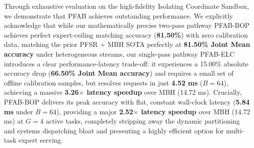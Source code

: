 Through exhaustive evaluation on the high-fidelity Isolating Coordinate Sandbox, we demonstrate that \textsc{PFAB} achieves outstanding performance. We explicitly acknowledge that while our mathematically precise two-pass pathway \textsc{PFAB-BOP} achieves perfect expert-ceiling matching accuracy (\textbf{81.50\%}) with zero calibration data, matching the prior \textsc{PFSR} + \textsc{MBH} SOTA perfectly at \textbf{81.50\% Joint Mean accuracy} under heterogeneous streams, our single-pass pathway \textsc{PFAB-ELC} introduces a clear performance-latency trade-off: it experiences a 15.00\% absolute accuracy drop (\textbf{66.50\% Joint Mean accuracy}) and requires a small set of offline calibration samples, but resolves requests in just \textbf{4.52 ms} ($B=64$), achieving a massive \textbf{3.26$\times$ latency speedup} over MBH (14.72 ms). Crucially, \textsc{PFAB-BOP} delivers its peak accuracy with flat, constant wall-clock latency (\textbf{5.84 ms} under $B=64$), providing a major \textbf{2.52$\times$ latency speedup} over \textsc{MBH} (14.72 ms) at $G=4$ active tasks, completely stripping away the dynamic partitioning and systems dispatching bloat and presenting a highly efficient option for multi-task expert serving.
